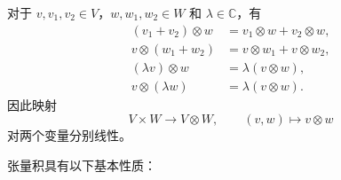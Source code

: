 \documentclass[UTF8,a4paper,11pt,openany]{ctexbook}
\begin{document}
\begin{proposition}[张量积的双线性]
对于 $v,v_1,v_2\in V$，$w,w_1,w_2\in W$ 和
$\lambda\in\mathbb C$，有
\begin{align}
    (v_1+v_2)\otimes w
    &=
    v_1\otimes w+v_2\otimes w,
    \nonumber\\
    v\otimes(w_1+w_2)
    &=
    v\otimes w_1+v\otimes w_2,
    \nonumber\\
    (\lambda v)\otimes w
    &=
    \lambda(v\otimes w),
    \nonumber\\
    v\otimes(\lambda w)
    &=
    \lambda(v\otimes w).
\end{align}
因此映射
\[
V\times W\longrightarrow V\otimes W,
\qquad
(v,w)\longmapsto v\otimes w
\]
对两个变量分别线性。
\end{proposition}

张量积具有以下基本性质：
\end{document}
